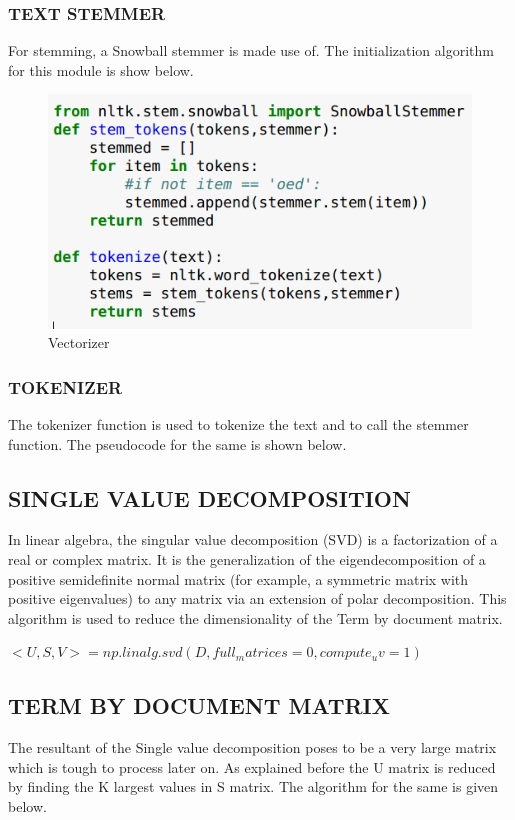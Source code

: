 \subsubsection{TEXT STEMMER}


For stemming, a Snowball stemmer is made use of. The initialization algorithm for this module is show below.

\begin{figure}[h]
\centering\includegraphics[width=0.8\linewidth]{vec.png}
\caption{Vectorizer}
\end{figure}

\subsubsection{TOKENIZER}


The tokenizer function is used to tokenize the text and to call the stemmer function. The pseudocode for the same is shown below.


\subsection{SINGLE VALUE DECOMPOSITION}
In linear algebra, the singular value decomposition (SVD) is a factorization of a real or complex matrix. It is the generalization of the eigendecomposition of a positive semidefinite normal matrix (for example, a symmetric matrix with positive eigenvalues) to any matrix via an extension of polar decomposition. This algorithm is used to reduce the dimensionality of the Term by document matrix.

$<U,S,V>=np.linalg.svd(D, full_matrices=0, compute_uv=1)$  

\subsection{TERM BY DOCUMENT MATRIX}
The resultant of the Single value decomposition poses to be a very large matrix which is tough to process later on. As explained before the U matrix is reduced by finding the K largest values in S matrix. The algorithm for the same is given below.

